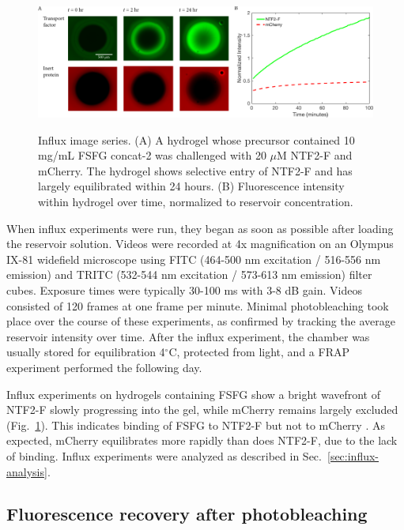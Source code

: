 \begin{figure}
\caption[Influx experiments images and accumulation.]{Influx image series.  (A) A hydrogel whose precursor contained 10 mg/mL FSFG concat-2 was challenged with 20 $\mu$M NTF2-F and mCherry.  The hydrogel shows selective entry of NTF2-F and has largely equilibrated within 24 hours. (B) Fluorescence intensity within hydrogel over time, normalized to reservoir concentration.}
\centering
\includegraphics[width=\textwidth]{figs/ch04/influx-images-clean.pdf}
\label{fig:influx-images}
\end{figure} 

When influx experiments were run, they began as soon as possible after loading the reservoir solution.  Videos were recorded at 4x magnification on an Olympus IX-81 widefield microscope using FITC (464-500 nm excitation / 516-556 nm emission) and TRITC (532-544 nm excitation / 573-613 nm emission) filter cubes.  Exposure times were typically 30-100 ms with 3-8 dB gain.  Videos consisted of 120 frames at one frame per minute. Minimal photobleaching took place over the course of these experiments, as confirmed by tracking the average reservoir intensity over time.  After the influx experiment, the chamber was usually stored for equilibration 4$^\circ$C, protected from light, and a FRAP experiment performed the following day.

Influx experiments on hydrogels containing FSFG show a bright wavefront  of NTF2-F slowly progressing into the gel, while mCherry remains largely excluded (Fig.~\ref{fig:influx-images}).  This indicates binding of FSFG to NTF2-F but not to mCherry .  As expected, mCherry equilibrates more rapidly than does NTF2-F, due to the lack of binding.  Influx experiments were analyzed as described in Sec.~\ref{sec:influx-analysis}.

\subsection{Fluorescence recovery after photobleaching}

